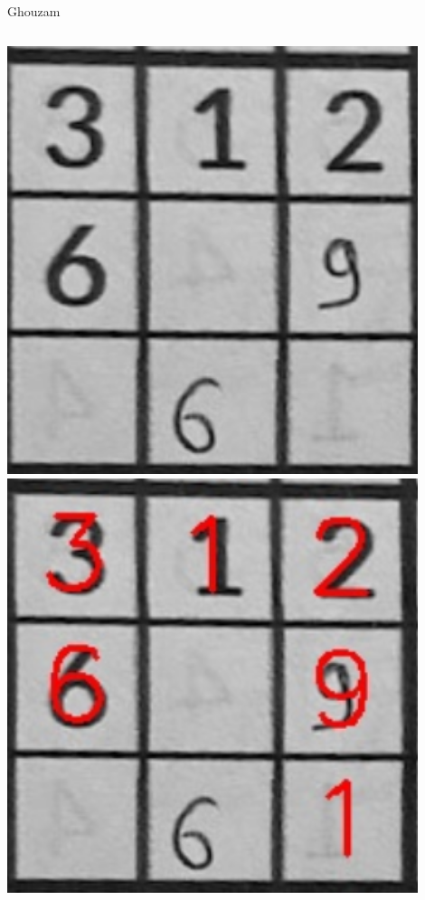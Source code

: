 \documentclass[12pt, dvipsnames]{beamer}
\begin{document}
\begin{frame}{Ghouzam}
{\begin{columns}
            \includegraphics[width=0.9\textwidth]{resources/png/surimpression1.png}
            \centering
            \includegraphics[width=0.9\textwidth]{resources/png/surimpression2.png}
        \end{columns}
    }
\end{frame}
\end{document}
